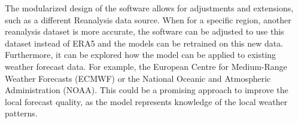 The modularized design of the software allows for adjustments and extensions, such as a different Reanalysis data source.
When for a specific region, another reanalysis dataset is more accurate, the software can be adjusted to use this dataset instead of ERA5 and the models can be retrained on this new data.
Furthermore, it can be explored how the model can be applied to existing weather forecast data. For example, the European Centre for Medium-Range Weather Forecasts (ECMWF) or the National Oceanic and Atmospheric Administration (NOAA).
This could be a promising approach to improve the local forecast quality, as the model represents knowledge of the local weather patterns.